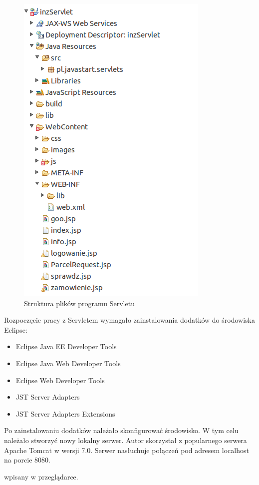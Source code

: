 \documentclass[eng,printmode,oneside]{mgr}
\begin{document}
\begin{figure}
\centering
\captionsetup{justification=centering,margin=0cm}
\vspace{-10pt}
\begin{centering}
\includegraphics[width=.45\textwidth]{strukturaServlet.png}
\end{centering}
  \caption{Struktura plików programu Servletu}
\label{fig:servlet}
\vspace{-60pt}
\end{figure}

Rozpoczęcie pracy z Servletem wymagało zainstalowania dodatków do środowiska
Eclipse:
\begin{itemize}
  \item Eclipse Java EE Developer Tools
  \item Eclipse Java Web Developer Tools
  \item Eclipse Web Developer Tools
  \item JST Server Adapters
  \item JST Server Adapters Extensions
\end{itemize}

Po zainstalowaniu dodatków należało skonfigurować środowisko. W tym celu
należało stworzyć nowy lokalny serwer. Autor skorzystał z popularnego serwera Apache
Tomcat w wersji 7.0. Serwer nasłuchuje połączeń pod adresem localhost na
porcie 8080.

     wpisany w przeglądarce.
\end{document}
